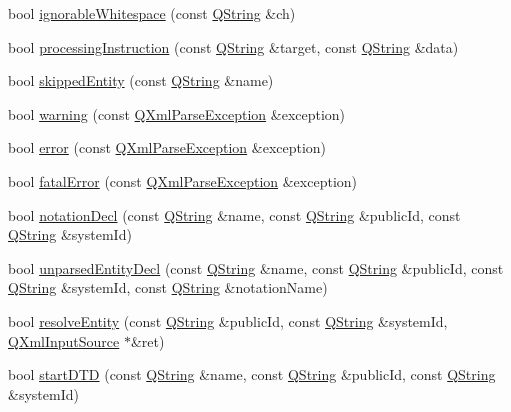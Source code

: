 \begin{DoxyCompactItemize}
bool \mbox{\hyperlink{class_q_xml_default_handler_aaba270fb05abfab3f80c31312f6537af}{ignorable\+Whitespace}} (const \mbox{\hyperlink{class_q_string}{Q\+String}} \&ch)
\item 
bool \mbox{\hyperlink{class_q_xml_default_handler_afd9bbe78b71f7787e22a3a7555ddba59}{processing\+Instruction}} (const \mbox{\hyperlink{class_q_string}{Q\+String}} \&target, const \mbox{\hyperlink{class_q_string}{Q\+String}} \&data)
\item 
bool \mbox{\hyperlink{class_q_xml_default_handler_a8c02fbe04d75e0ac50202f21e101e5c9}{skipped\+Entity}} (const \mbox{\hyperlink{class_q_string}{Q\+String}} \&name)
\item 
bool \mbox{\hyperlink{class_q_xml_default_handler_acaabb9885b0d301b151112ea3e05f361}{warning}} (const \mbox{\hyperlink{class_q_xml_parse_exception}{Q\+Xml\+Parse\+Exception}} \&exception)
\item 
bool \mbox{\hyperlink{class_q_xml_default_handler_a2511bdad8a588353b28292266cf6bdd4}{error}} (const \mbox{\hyperlink{class_q_xml_parse_exception}{Q\+Xml\+Parse\+Exception}} \&exception)
\item 
bool \mbox{\hyperlink{class_q_xml_default_handler_a365448a99398f6939706d6e63e6b215d}{fatal\+Error}} (const \mbox{\hyperlink{class_q_xml_parse_exception}{Q\+Xml\+Parse\+Exception}} \&exception)
\item 
bool \mbox{\hyperlink{class_q_xml_default_handler_aaa24e258c75cd45e2bd560864b418958}{notation\+Decl}} (const \mbox{\hyperlink{class_q_string}{Q\+String}} \&name, const \mbox{\hyperlink{class_q_string}{Q\+String}} \&public\+Id, const \mbox{\hyperlink{class_q_string}{Q\+String}} \&system\+Id)
\item 
bool \mbox{\hyperlink{class_q_xml_default_handler_ae4fe530e822e9d5d92a1c849c3f96488}{unparsed\+Entity\+Decl}} (const \mbox{\hyperlink{class_q_string}{Q\+String}} \&name, const \mbox{\hyperlink{class_q_string}{Q\+String}} \&public\+Id, const \mbox{\hyperlink{class_q_string}{Q\+String}} \&system\+Id, const \mbox{\hyperlink{class_q_string}{Q\+String}} \&notation\+Name)
\item 
bool \mbox{\hyperlink{class_q_xml_default_handler_ac2fa1a7aff599d2832fca1d650a435a7}{resolve\+Entity}} (const \mbox{\hyperlink{class_q_string}{Q\+String}} \&public\+Id, const \mbox{\hyperlink{class_q_string}{Q\+String}} \&system\+Id, \mbox{\hyperlink{class_q_xml_input_source}{Q\+Xml\+Input\+Source}} $\ast$\&ret)
\item 
bool \mbox{\hyperlink{class_q_xml_default_handler_a998b69468c42957be5d2778cadece341}{start\+D\+TD}} (const \mbox{\hyperlink{class_q_string}{Q\+String}} \&name, const \mbox{\hyperlink{class_q_string}{Q\+String}} \&public\+Id, const \mbox{\hyperlink{class_q_string}{Q\+String}} \&system\+Id)

\end{DoxyCompactItemize}
